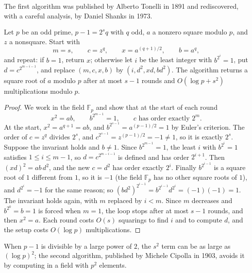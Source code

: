 The first algorithm was published by Alberto Tonelli in 1891 and rediscovered, with a careful analysis, by Daniel Shanks in 1973.

\begin{theorem}\label{thm:tonelli}
Let $p$ be an odd prime, $p-1=2^sq$ with $q$ odd, $a$ a nonzero square modulo $p$, and $z$ a nonsquare. Start with
\[
m=s,\qquad c=z^q,\qquad x=a^{(q+1)/2},\qquad b=a^q,
\]
and repeat: if $b=1$, return $x$; otherwise let $i$ be the least integer with $b^{2^i}=1$, put $d=c^{2^{m-i-1}}$, and replace $(m,c,x,b)$ by $(i,d^2,xd,bd^2)$. The algorithm returns a square root of $a$ modulo $p$ after at most $s-1$ rounds and $O(\log p+s^2)$ multiplications modulo $p$.
\end{theorem}
\begin{proof}
We work in the field $\mathbb F_p$ and show that at the start of each round
\[
x^2=ab,\qquad b^{2^{m-1}}=1,\qquad c\text{ has order exactly }2^m.
\]
At the start, $x^2=a^{q+1}=ab$, and $b^{2^{s-1}}=a^{(p-1)/2}=1$ by Euler's criterion. The order of $c=z^q$ divides $2^s$, and $c^{2^{s-1}}=z^{(p-1)/2}=-1\ne1$, so it is exactly $2^s$.
Suppose the invariant holds and $b\ne1$. Since $b^{2^{m-1}}=1$, the least $i$ with $b^{2^i}=1$ satisfies $1\le i\le m-1$, so $d=c^{2^{m-i-1}}$ is defined and has order $2^{i+1}$. Then $(xd)^2=ab\,d^2$, and the new $c=d^2$ has order exactly $2^i$. Finally $b^{2^{i-1}}$ is a square root of $1$ different from $1$, so it is $-1$ (the field $\mathbb F_p$ has no other square roots
of $1$), and $d^{2^i}=-1$ for the same reason; so $(bd^2)^{2^{i-1}}=b^{2^{i-1}}d^{2^i}=(-1)(-1)=1$. The invariant holds again, with $m$ replaced by $i<m$. Since $m$ decreases and $b^{2^0}=b=1$ is forced when $m=1$, the loop stops after at most $s-1$ rounds, and then $x^2=a$.
Each round costs $O(s)$ squarings to find $i$ and to compute $d$, and the setup costs $O(\log p)$ multiplications.
\end{proof}

When $p-1$ is divisible by a large power of $2$, the $s^2$ term can be as large as $(\log p)^2$; the second algorithm, published by Michele Cipolla in 1903, avoids it by computing in a field with $p^2$ elements.

